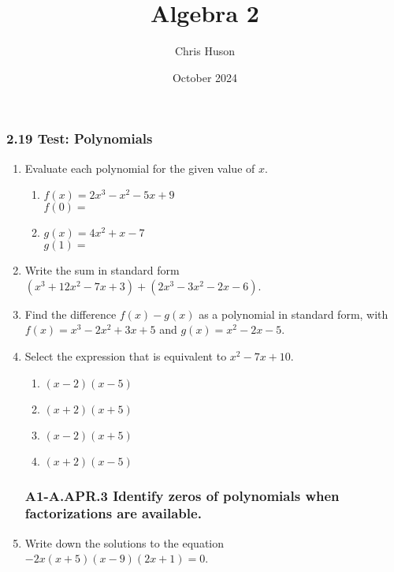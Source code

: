 \documentclass[12pt, twoside]{article}
\title{Algebra 2}
\author{Chris Huson}
\date{October 2024}
\begin{document}
\subsubsection*{2.19 Test: Polynomials}
\begin{enumerate}

\subsubsection*{A1-A.APR.1 Add, subtract, and multiply polynomials}
\item Evaluate each polynomial for the given value of $x$.
\begin{multicols}{2}
    \begin{enumerate}[itemsep=1cm]
        \item $f(x)=2x^3-x^2-5x+9$\\[0.25cm] 
        $f(0) = $
        \item $g(x)=4x^2+x-7$ \\[0.25cm] 
        $g(1) = $
    \end{enumerate}
    \end{multicols} \vspace{1cm}

\item Write the sum in standard form $(x^3+12x^2-7x+3)+(2x^3-3x^2-2x-6)$. \vspace{5cm}

\item Find the difference $f(x)-g(x)$ as a polynomial in standard form, with \\[0.25cm]
    $f(x)=x^3-2x^2+3x+5$ and $g(x)=x^2-2x-5$. \vspace{5cm}


\item Select the expression that is equivalent to $x^2-7x+10$.
    \begin{multicols}{2}
    \begin{enumerate}
        \item $(x-2)(x-5)$
        \item $(x+2)(x+5)$
        \item $(x-2)(x+5)$
        \item $(x+2)(x-5)$
    \end{enumerate} 
    \end{multicols}

\newpage
\subsubsection*{A1-A.APR.3 Identify zeros of polynomials when factorizations are available.}
\item Write down the solutions to the equation $-2x(x+5)(x-9)(2x+1)=0$. \vspace{2cm}
    

\end{enumerate}
\end{document}
